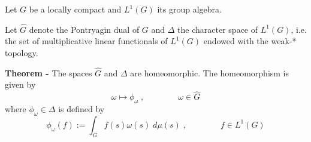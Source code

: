 \documentclass[12pt]{article}
\begin{document}
Let $G$ be a locally compact   and $L^1(G)$ its group algebra.

Let $\hat{G}$ denote the Pontryagin dual of $G$ and $\Delta$ the character space of $L^1(G)$, i.e. the set of multiplicative linear functionals of $L^1(G)$ endowed with the weak-* topology.

{\bf Theorem -} The spaces $\hat{G}$ and $\Delta$ are homeomorphic. The homeomorphism is given by
\begin{displaymath}
\omega \longmapsto \phi_{\omega}\;, \qquad\qquad \omega \in \hat{G}
\end{displaymath}
where $\phi_{\omega} \in \Delta$ is defined by
\begin{displaymath}
\phi_{\omega}(f):=\int_G f(s)\omega(s)\;d\mu(s)\;, \qquad\qquad f \in L^1(G)
\end{displaymath}
\end{document}
